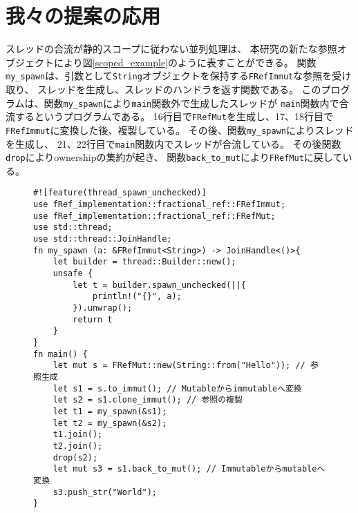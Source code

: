 \documentclass{sumiilab-paper}
\theoremstyle{mystyle}
\numberwithin{definition}{chapter} %
\begin{document}
\section{我々の提案の応用}
スレッドの合流が静的スコープに従わない並列処理は、
本研究の新たな参照オブジェクトにより図\ref{scoped_example}のように表すことができる。
関数\texttt{my\_spawn}は、引数として\texttt{String}オブジェクトを保持する\texttt{FRefImmut}な参照を受け取り、
スレッドを生成し、スレッドのハンドラを返す関数である。
このプログラムは、関数\texttt{my\_spawn}により\texttt{main}関数外で生成したスレッドが
\texttt{main}関数内で合流するというプログラムである。
16行目で\texttt{FRefMut}を生成し、17、18行目で\texttt{FRefImmut}に変換した後、複製している。
その後、関数\texttt{my\_spawn}によりスレッドを生成し、
21、22行目で\texttt{main}関数内でスレッドが合流している。
その後関数\texttt{drop}によりownershipの集約が起き、
関数\texttt{back\_to\_mut}により\texttt{FRefMut}に戻している。
\begin{figure}[htp]
\begin{lstlisting}[caption=新たな参照オブジェクトを用いた並列処理の例, 
  label=scoped_example, captionpos=b]
#![feature(thread_spawn_unchecked)]
use fRef_implementation::fractional_ref::FRefImmut;
use fRef_implementation::fractional_ref::FRefMut;
use std::thread;
use std::thread::JoinHandle;
fn my_spawn (a: &FRefImmut<String>) -> JoinHandle<()>{
    let builder = thread::Builder::new();
    unsafe {
        let t = builder.spawn_unchecked(||{
            println!("{}", a);
        }).unwrap();
        return t
    }
}
fn main() {
    let mut s = FRefMut::new(String::from("Hello")); // 参照生成
    let s1 = s.to_immut(); // Mutableからimmutableへ変換
    let s2 = s1.clone_immut(); // 参照の複製
    let t1 = my_spawn(&s1);
    let t2 = my_spawn(&s2); 
    t1.join();
    t2.join();
    drop(s2);
    let mut s3 = s1.back_to_mut(); // Immutableからmutableへ変換
    s3.push_str("World");
}
\end{lstlisting}
\end{figure}
\end{document}
